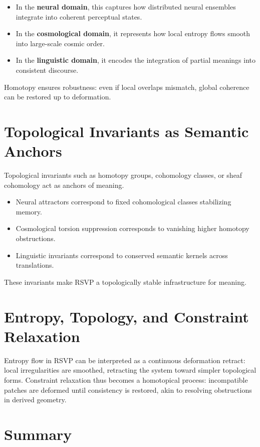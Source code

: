 \documentclass[a4paper,11pt,openany]{book}
\begin{document}
\begin{itemize}
  \item In the \textbf{neural domain}, this captures how distributed neural ensembles 
  integrate into coherent perceptual states.  
  \item In the \textbf{cosmological domain}, it represents how local entropy flows 
  smooth into large-scale cosmic order.  
  \item In the \textbf{linguistic domain}, it encodes the integration of partial 
  meanings into consistent discourse.  
\end{itemize}

Homotopy ensures robustness: even if local overlaps mismatch, global coherence can 
be restored up to deformation.  

\section{Topological Invariants as Semantic Anchors}

Topological invariants such as homotopy groups, cohomology classes, or sheaf 
cohomology act as anchors of meaning.  

\begin{itemize}
  \item Neural attractors correspond to fixed cohomological classes stabilizing 
  memory.  
  \item Cosmological torsion suppression corresponds to vanishing higher homotopy 
  obstructions.  
  \item Linguistic invariants correspond to conserved semantic kernels across 
  translations.  
\end{itemize}

These invariants make RSVP a topologically stable infrastructure for meaning.  

\section{Entropy, Topology, and Constraint Relaxation}

Entropy flow in RSVP can be interpreted as a continuous deformation retract: local 
irregularities are smoothed, retracting the system toward simpler topological forms.  
Constraint relaxation thus becomes a homotopical process: incompatible patches are 
deformed until consistency is restored, akin to resolving obstructions in derived 
geometry.  

\section{Summary}
\end{document}
